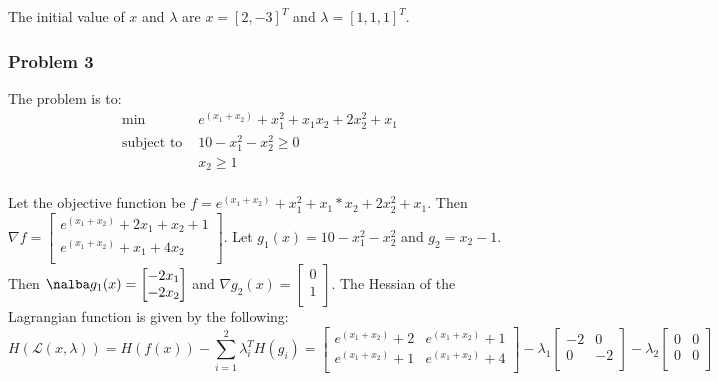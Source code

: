 \documentclass{article}
\begin{document}
The initial value of $x$ and $\lambda$ are $x = [2, -3]^T$ and $\lambda= [1, 1, 1]^T$. 


\subsubsection{Problem 3}
The problem is to:
\begin{equation*}
\begin{aligned}
\textrm{min } & e^{(x_1+x_2)}+x_1^2+x_1x_2+2x_2^2+x_1 \\
\textrm{subject to } & 10-x_1^2-x_2^2 \geq 0 \\
                     & x_2 \geq 1 \\
\end{aligned}
\end{equation*}

Let the objective function be $f =  e^{(x_1+x_2)}+x_1^2+x_1*x_2+2x_2^2+x_1$. Then $\nabla f = \begin{bmatrix} e^{(x_1+x_2)}+2x_1+x_2+1\\ e^{(x_1+x_2)}+x_1+4x_2 \\ \end{bmatrix}$. Let $g_1(x) = 10-x_1^2-x_2^2 $ and $g_2 = x_2-1$. Then $\nalba g_1(x) = \begin{bmatrix} -2x_1\\ -2x_2\\ \end{bmatrix}$ and $\nabla g_2(x) = \begin{bmatrix} 0 \\ 1 \\ \end{bmatrix}$. The Hessian of the Lagrangian function is given by the following: 
\begin{equation*}
    H(\mathcal{L}(x, \lambda)) = H(f(x)) - \sum_{i=1}^2 \lambda_i^T H(g_i) = \begin{bmatrix} e^{(x_1+x_2)}+2 &  e^{(x_1+x_2)}+1 \\ e^{(x_1+x_2)}+1 & e^{(x_1+x_2)}+4 \\ \end{bmatrix} - \lambda_1 \begin{bmatrix} -2 & 0\\ 0 & -2\\ \end{bmatrix}- \lambda_2 \begin{bmatrix} 0 & 0\\ 0 & 0 \\ \end{bmatrix}
\end{equation*}
\end{document}
